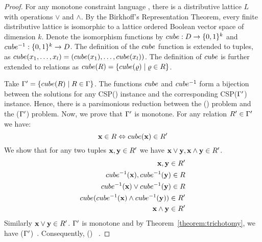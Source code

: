 \begin{proof}
For any monotone constraint language \mrelset, there is a distributive lattice \(L\) with operations
\(\vee\) and \(\wedge\)\@. By the Birkhoff's Representation Theorem, every finite distributive lattice
is isomorphic to a lattice ordered Boolean vector space of dimension \(k\)\@.
Denote the isomorphism functions by \(cube: D \to \{{0,1}\}^k\) and 
\(cube^{-1} : \{{0,1}\}^k\to D\)\@. The definition of the \(cube\) function
is extended to tuples, as \(cube(x_1,\dotsc,x_l)=(cube(x_1),\dotsc,cube(x_l))\)\@.
The definition of \(cube\) is further extended to relations as 
\(cube(R) = \{{cube(\varrho) \mid \varrho \in R}\}\)\@.

Take \(\Gamma'=\{{cube(R)\mid R\in \Gamma}\}\)\@. The functions \(cube\) and
\(cube^{-1}\) form a bijection between the solutions for any CSP(\mrelset) instance and the 
corresponding CSP(\(\Gamma'\)) instance. Hence, there is a parsimonious reduction between 
the \ccsp(\mrelset) problem and the \ccsp(\(\Gamma'\)) problem. Now, we prove that
\(\Gamma'\) is monotone. For any relation \(R' \in \Gamma'\) we have:
\[\textbf{x} \in R \Leftrightarrow cube(\textbf{x}) \in R'\]
We show that for any two tuples \(\textbf{x},\textbf{y}\in R'\) we have 
\(\textbf{x} \vee \textbf{y}, \textbf{x}\wedge\textbf{y}\in R'\).
\begin{eqnarray*}
\textbf{x},\textbf{y} \in R'  \\
cube^{-1}(\textbf{x}),cube^{-1}(\textbf{y})\in R  \\
cube^{-1}(\textbf{x}) \vee cube^{-1}(\textbf{y}) \in R  \\
cube(cube^{-1}(\textbf{x})\wedge cube^{-1}(\textbf{y}))\in R' \\
\textbf{x} \wedge \textbf{y} \in R' \\
\end{eqnarray*}
Similarly \(\textbf{x} \vee \textbf{y} \in R'\)\@.
\(\Gamma'\) is monotone and by Theorem~\ref{theorem:trichotomy}, we have 
\ccsp(\(\Gamma'\))\maple\ \cbis\@. Consequently, \ccsp(\mrelset) \maple\ \cbis\@.
\end{proof}

